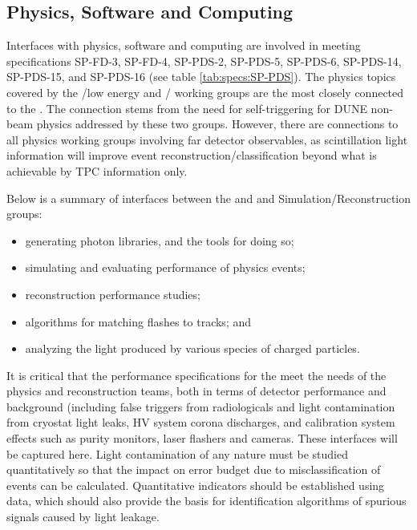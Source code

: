 \subsection{Physics, Software and Computing}


Interfaces with physics, software and computing are involved in meeting specifications SP-FD-3, SP-FD-4, SP-PDS-2, SP-PDS-5, SP-PDS-6, SP-PDS-14, SP-PDS-15, and SP-PDS-16 (see table \ref{tab:specs:SP-PDS}). The physics topics covered by the %
/low energy and / working groups are the most closely connected to the \single {}. The connection stems from the need for self-triggering for DUNE non-beam physics addressed by these two groups. 
However, there are connections to all physics working groups involving far detector observables, as scintillation light information will improve event reconstruction/classification beyond what is achievable by TPC information only. 



Below is a summary of interfaces between the \dune \single {} and  and  Simulation/Reconstruction groups:

\begin{itemize}
    \item generating photon libraries, and the tools for doing so;
    \item simulating and evaluating performance of physics events;
    \item \single {} reconstruction performance studies;
    \item algorithms for matching flashes to  tracks; and
    \item analyzing the light produced by various species of charged particles.
\end{itemize}

It is critical that the performance specifications for the  meet the needs of the physics and reconstruction teams, both in terms of detector performance and background (including false triggers from radiologicals and light contamination from cryostat light leaks, HV system corona discharges, and calibration system effects such as purity monitors, laser flashers and cameras.  These interfaces will be captured here.
Light contamination of any nature must be studied quantitatively so that the impact on error budget due to misclassification of events can be calculated. Quantitative indicators should be established using  data, which should also provide the basis for identification algorithms of spurious signals caused by light leakage. 




